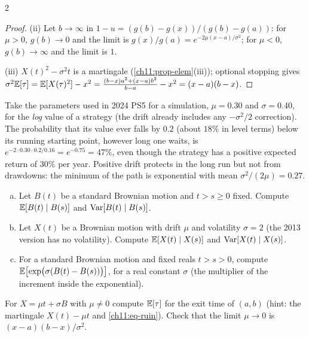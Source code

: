 \begin{paracol}{2}
\begin{proof}
(ii) Let $b\to\infty$ in
$1-u=(g(b)-g(x))/(g(b)-g(a))$: for $\mu>0$, $g(b)\to0$ and the limit is $g(x)/g(a)=e^{-2\mu(x-a)/\sigma^2}$; for $\mu<0$, $g(b)\to\infty$ and the limit is $1$.

(iii) $X(t)^2-\sigma^2t$ is a martingale (\cref{ch11:prop-elem}(iii)); optional stopping gives $\sigma^2\mathbb{E}[\tau]=\mathbb{E}[X(\tau)^2]-x^2
=\frac{(b-x)a^2+(x-a)b^2}{b-a}-x^2=(x-a)(b-x)$.
\end{proof}

\begin{finance}
Take the parameters used in 2024 PS5 for a simulation, $\mu=0.30$ and $\sigma=0.40$, for the \emph{log} value of a strategy (the drift
already includes any $-\sigma^2/2$ correction). The probability that its value ever falls by $0.2$ (about $18\%$ in level terms) below its running
starting point, however long one waits, is $e^{-2\cdot0.30\cdot0.2/0.16}=e^{-0.75}=47\%$, even though the strategy has a positive expected return of
$30\%$ per year. Positive drift protects in the long run but not from drawdowns: the minimum of the path is exponential with mean $\sigma^2/(2\mu)=0.27$.
\end{finance}

\begin{exercise}\label{ch11:ex-cond}
\leavevmode
\begin{enumerate}[(a)]
  \item Let $B(t)$ be a standard Brownian motion and $t>s\ge0$ fixed. Compute $\mathbb{E}[B(t)\mid B(s)]$ and $\operatorname{Var}[B(t)\mid B(s)]$.
  \item Let $X(t)$ be a Brownian motion with drift $\mu$ and volatility $\sigma=2$ (the 2013 version has no volatility). Compute $\mathbb{E}[X(t)\mid X(s)]$ and $\operatorname{Var}[X(t)\mid X(s)]$.
  \item For a standard Brownian motion and fixed reals $t>s>0$, compute $\mathbb{E}\bigl[\exp\bigl(\sigma(B(t)-B(s))\bigr)\bigr]$, for a real constant $\sigma$ (the multiplier of the increment inside the exponential).
\end{enumerate}
\end{exercise}

\begin{exercise}\label{ch11:ex-exit}
For $X=\mu t+\sigma B$ with $\mu\ne0$ compute $\mathbb{E}[\tau]$ for the exit time of $(a,b)$ (hint: the martingale $X(t)-\mu t$ and \eqref{ch11:eq-ruin}). Check that the limit $\mu\to0$ is $(x-a)(b-x)/\sigma^2$.
\end{exercise}


\end{paracol}
